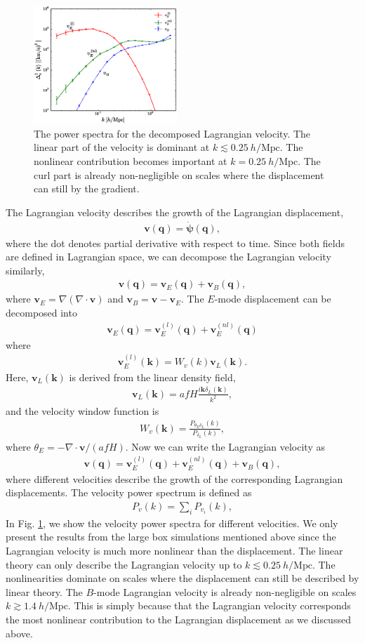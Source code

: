 \documentclass[aps,prx,twocolumn,superscriptaddress,groupedaddress,nofootinbib,amsfont]{revtex4}  %
\newcommand{\mr}{\mathrm}
\newcommand{\bea}{\begin{eqnarray}}
\newcommand{\eea}{\end{eqnarray}}
\newcommand{\bmp}{\bm{\psi}}
\newcommand{\bmv}{\bm{v}}
\newcommand{\bmk}{\bm{k}}
\newcommand{\bmq}{\bm{q}}
\begin{document}
\begin{figure}[tbp]
\begin{center}
\includegraphics[width=0.48\textwidth]{f5.eps}
\end{center}
\vspace{-0.7cm}
\caption{The power spectra for the decomposed Lagrangian velocity. The linear
    part of the velocity is dominant at $k\lesssim0.25\ h/\mr{Mpc}$. 
    The nonlinear contribution becomes important at $k=0.25\ h/\mr{Mpc}$. 
    The curl part is already non-negligible on scales where the displacement 
    can still by the gradient.}
\label{fig:pk_vel}
\end{figure}

The Lagrangian velocity describes the growth of the Lagrangian displacement,
\bea
\bmv(\bmq)=\dot{\bmp}(\bmq),
\eea
where the dot denotes partial derivative with respect to time.
Since both fields are defined in Lagrangian space, we can decompose the 
Lagrangian velocity similarly,
\bea
\bmv(\bmq)=\bmv_E(\bmq)+\bmv_B(\bmq),
\eea
where $\bmv_E=\nabla(\nabla\cdot\bmv)$ and $\bmv_B=\bmv-\bmv_E$. 
The $E$-mode displacement can be decomposed into
\bea
\bmv_E(\bmq)=\bmv_E^{(l)}(\bmq)+\bmv_E^{(nl)}(\bmq)
\eea
where 
\bea
\bmv_E^{(l)}(\bmk)=W_v(k)\bmv_L(\bmk).
\eea
Here, $\bmv_L(\bmk)$ is derived from the linear density field,
\bea
\bmv_L(\bmk)=afH\frac{i\bmk\delta_L(\bmk)}{k^2},
\eea
and the velocity window function is 
\bea
W_v(\bmk)=\frac{P_{\theta_E\delta_L}(k)}{P_{\delta_L}(k)},
\eea
where $\theta_E=-\nabla\cdot\bmv/(afH)$. 
Now we can write the Lagrangian velocity as
\bea
\bmv(\bmq)=\bmv_E^{(l)}(\bmq)+\bmv_E^{(nl)}(\bmq)+\bmv_B(\bmq),
\eea
where different velocities describe the growth of the corresponding Lagrangian displacements.
The velocity power spectrum is defined as
\bea
P_v(k)=\sum_iP_{v_i}(k),
\eea
In Fig. \ref{fig:pk_vel}, we show the velocity power spectra for different velocities. We only present the results from the large box simulations mentioned above since the Lagrangian velocity is much more nonlinear than the displacement.
The linear theory can only describe the Lagrangian velocity up to $k\lesssim0.25\ h/\mr{Mpc}$. The nonlinearities dominate on scales where the displacement can 
still be described by linear theory. The $B$-mode Lagrangian velocity is already
non-negligible on scales $k\gtrsim1.4\ h/\mr{Mpc}$. 
This is simply because that the Lagrangian velocity corresponds the most 
nonlinear contribution to the Lagrangian displacement as we discussed above. 
\end{document}
